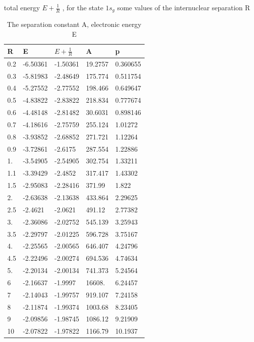    \begin{table}[h!]
  \caption{ The separation constant A, electronic energy E}{total energy $ E + \frac{1}{R} $ , for the state $ 1s_g $ some values of the internuclear separation R }
  \centering
  \label{1sg}
		\begin{tabular}{ m{6em} m{6em}  m{6em}  m{6em} m{6em} }
			\hline
			R & E & $ E + \frac{1}{R} $ & A & p \\ \hline \hline
 0.2 & -6.50361 & -1.50361 & 19.2757 & 0.360655\\
 0.3 & -5.81983 & -2.48649 & 175.774 & 0.511754\\
 0.4 & -5.27552 & -2.77552 & 198.466 & 0.649647\\
 0.5 & -4.83822 & -2.83822 & 218.834 & 0.777674\\
 0.6 & -4.48148 & -2.81482 & 30.6031 & 0.898146\\
 0.7 & -4.18616 & -2.75759 & 255.124 & 1.01272\\
 0.8 & -3.93852 & -2.68852 & 271.721 & 1.12264\\
 0.9 & -3.72861 & -2.6175 & 287.554 & 1.22886\\
 1. & -3.54905 & -2.54905 & 302.754 & 1.33211\\
 1.1 & -3.39429 & -2.4852 & 317.417 & 1.43302\\
 1.5 & -2.95083 & -2.28416 & 371.99 & 1.822\\
 2. & -2.63638 & -2.13638 & 433.864 & 2.29625\\
 2.5 & -2.4621 & -2.0621 & 491.12 & 2.77382\\
 3. & -2.36086 & -2.02752 & 545.139 & 3.25943\\
 3.5 & -2.29797 & -2.01225 & 596.728 & 3.75167\\
 4. & -2.25565 & -2.00565 & 646.407 & 4.24796\\
 4.5 & -2.22496 & -2.00274 & 694.536 & 4.74634\\
 5. & -2.20134 & -2.00134 & 741.373 & 5.24564\\
 6 & -2.16637 & -1.9997 & 16608. & 6.24457\\
 7 & -2.14043 & -1.99757 & 919.107 & 7.24158\\
 8 & -2.11874 & -1.99374 & 1003.68 & 8.23405\\
 9 & -2.09856 & -1.98745 & 1086.12 & 9.21909\\
 10 & -2.07822 & -1.97822 & 1166.79 & 10.1937 \\
          \hline
		\end{tabular}
    \end{table}

